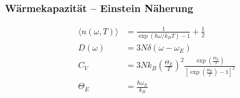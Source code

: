 \subsubsection*{Wärmekapazität – Einstein Näherung}
\begin{equation*}
    \begin{aligned}
        \langle n(\omega,T) \rangle &= \frac{1}{\exp(\hbar \omega / k_B T) -1} + \frac{1}{2}\\
        D(\omega) &= 3N \delta(\omega-\omega_E) \\
        C_V &= 3N k_B \left(\frac{\Theta_E}{T}\right)^2 \frac{\exp\left(\frac{\Theta_E}{T}\right)}{\left[\exp \left(\frac{\Theta_E}{T}\right)-1\right]^2} \\
        \Theta_E &= \frac{\hbar \omega_E}{k_B}
    \end{aligned}
\end{equation*}